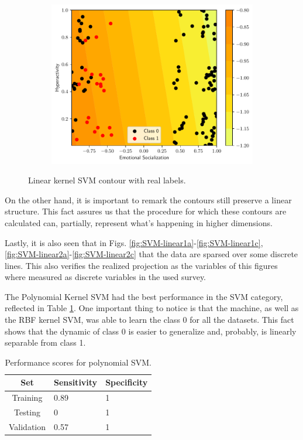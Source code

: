 \begin{figure}
\begin{subfigure}[b]{0.32\textwidth}
    \includegraphics[width=\textwidth]{figs/svm-linear-contour-2-5.pdf}
    \caption{}
  \end{subfigure}
  \caption{Linear kernel SVM contour with real labels.}
  \label{fig:SVM-linear}
\end{figure}

On the other hand, it is important to remark the contours still preserve a
linear structure. This fact assures us that the procedure for which these
contours are calculated can, partially, represent what's happening in higher
dimensions.

Lastly, it is also seen that in Figs.
\ref{fig:SVM-linear1a}-\ref{fig:SVM-linear1c},
\ref{fig:SVM-linear2a}-\ref{fig:SVM-linear2c} that the data are sparsed over
some discrete lines. This also verifies the realized projection as the variables
of this figures where measured as discrete variables in the used survey.

The Polynomial Kernel SVM had the best performance in the SVM category,
reflected in Table \ref{tab:poly_SVM}. One important thing to notice is that the
machine, as well as the RBF kernel SVM, was able to learn the class 0 for all
the datasets. This fact shows that the dynamic of class 0 is easier to
generalize and, probably, is linearly separable from class 1.

\begin{table}
  \centering
  \caption{Performance scores for polynomial SVM.}
  \label{tab:poly_SVM}
  \begin{tabular}{cll}
    \hline
    \textbf{Set} & \multicolumn{1}{c}{\textbf{Sensitivity}} & \multicolumn{1}{c}{\textbf{Specificity}} \\ \hline
    Training & 0.89 & 1 \\
    Testing & 0 & 1 \\
    Validation & 0.57 & 1 \\ \hline
  \end{tabular}
\end{table}

